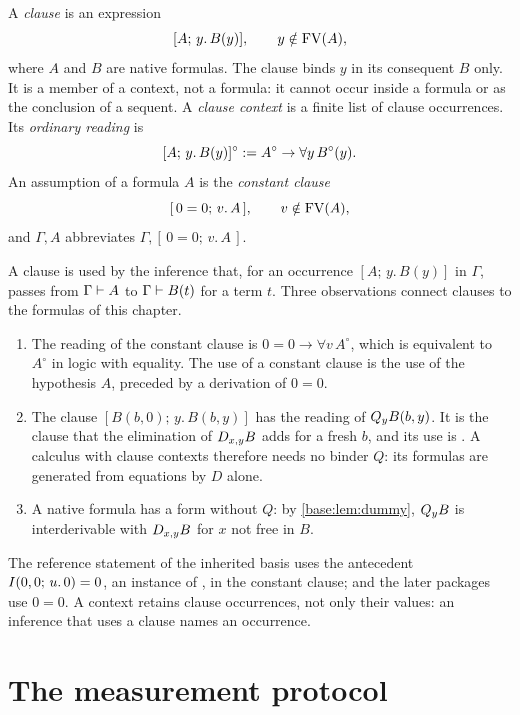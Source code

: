 \begin{definition}
\label{base:def:clause}
A \emph{clause} is an expression
\[
 [A;\,y.\,B(y)],\qquad y\notin\operatorname{FV}(A),
\]
where $A$ and $B$ are native formulas.  The clause binds $y$ in its
consequent $B$ only.  It is a member of a context, not a formula: it cannot
occur inside a formula or as the conclusion of a sequent.  A \emph{clause
context} is a finite list of clause occurrences.  Its \emph{ordinary
reading} is
\[
 [A;\,y.\,B(y)]^\circ\mathrel{:=} A^\circ\to\forall y\,B^\circ(y).
\]
An assumption of a formula $A$ is the \emph{constant clause}
\[
 [\,0=0;\,v.\,A\,],\qquad v\notin\operatorname{FV}(A),
\]
and $\Gamma,A$ abbreviates $\Gamma,[\,0=0;\,v.\,A\,]$.
\end{definition}

A clause is used by the inference that, for an occurrence
$[A;\,y.\,B(y)]$ in $\Gamma$, passes from $\Gamma\vdash A$ to
$\Gamma\vdash B(t)$ for a term $t$.  Three observations connect clauses to
the formulas of this chapter.
\begin{enumerate}[label=\textup{(\roman*)}]
\item The reading of the constant clause is
 $0=0\to\forall v\,A^\circ$, which is equivalent to $A^\circ$ in logic with
 equality.  The use of a constant clause is the use of the hypothesis $A$,
 preceded by a derivation of $0=0$.
\item The clause $[B(b,0);\,y.\,B(b,y)]$ has the reading of
 $Q_{y}B(b,y)$.  It is the clause that the elimination of $D_{x,y}B$ adds
 for a fresh $b$, and its use is .  A calculus with clause
 contexts therefore needs no binder $Q$: its formulas are generated from
 equations by $D$ alone.
\item A native formula has a form without $Q$: by \cref{base:lem:dummy},
 $Q_{y}B$ is interderivable with $D_{x,y}B$ for $x$ not free in $B$.
\end{enumerate}
The reference statement of the inherited basis uses the antecedent
$I(0,0;\,u.\,0)=0$, an instance of , in the constant clause;
 and the later packages use $0=0$.  A context retains
clause occurrences, not only their values: an inference that uses a clause
names an occurrence.

\section{The measurement protocol}
\label{base:sec:measure}

